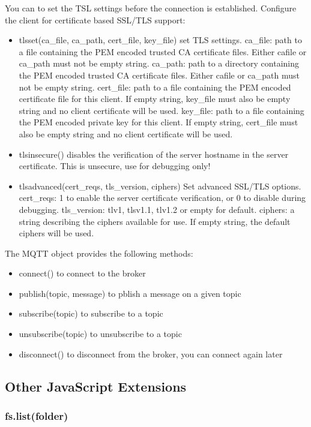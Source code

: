 You can to set the TSL settings before the connection is established.
Configure the client for certificate based SSL/TLS support:
\begin{itemize}
\item tlsset(ca\_file, ca\_path, cert\_file, key\_file) set TLS settings.
ca\_file: path to a file containing the PEM encoded trusted CA certificate files. Either cafile or ca\_path must not be empty string.
ca\_path: path to a directory containing the PEM encoded trusted CA certificate files. Either cafile or ca\_path must not be empty string.
cert\_file: path to a file containing the PEM encoded certificate file for this client. If empty string, key\_file must also be empty string and no client certificate will be used.
key\_file: path to a file containing the PEM encoded private key for this client. If empty string, cert\_file must also be empty string and no client certificate will be used.
\item tlsinsecure() disables the verification of the server hostname in the server certificate. This is unsecure, use for debugging only!
\item tlsadvanced(cert\_reqs, tls\_version, ciphers) Set advanced SSL/TLS options.
cert\_reqs: 1 to enable the server certificate verification, or 0 to disable during debugging.
tls\_version: tlv1, tlsv1.1, tlv1.2 or empty for default.
ciphers: a string describing the ciphers available for use. If empty string, the default ciphers will be used.
\end{itemize}

The MQTT object provides the following methods:
\begin{itemize}
\item connect() to connect to the broker
\item publish(topic, message) to pblish a message on a given topic
\item subscribe(topic) to subscribe to a topic
\item unsubscribe(topic) to unsubscribe to a topic
\item disconnect() to disconnect from the broker, you can connect again later
\end{itemize}

\subsection{Other JavaScript Extensions}

\subsubsection{fs.list(folder)}

